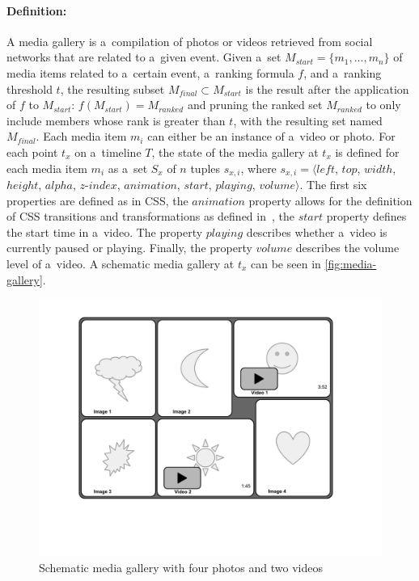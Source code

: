 \paragraph{Definition:}

A media gallery is a~compilation of photos or videos
retrieved from social networks that are related to a~given event.
Given a~set $M_{start} = \{m_1,..., m_n\}$ of media items related to a~certain event,
a~ranking formula $f$, and a~ranking threshold $t$,
the resulting subset $M_{final} \subset M_{start}$
is the result after the application of $f$ to $M_{start}$: $f(M_{start})=M_{ranked}$
and pruning the ranked set $M_{ranked}$ to only include members
whose rank is greater than $t$, with the resulting set named $M_{final}$.
Each media item $m_i$ can either be an instance of a~video or photo.
For each point $t_x$ on a~timeline $T$, the state of the media gallery
at $t_x$ is defined for each media item $m_i$
as a~set $S_x$ of $n$ tuples $s_{x,i}$, where
$s_{x,i}=\langle \mathit{left}$, $\mathit{top}$, $\mathit{width}$, $\mathit{height}$,
$\mathit{alpha}$, $\mathit{z\mbox{-}index}$, $\mathit{animation}$,
$\mathit{start}$, $\mathit{playing}$, $\mathit{volume} \rangle$.
The first six properties are defined as in CSS, the $\mathit{animation}$ property
allows for the definition of CSS transitions
and transformations as defined in~\cite{jackson2013csstransitions,fraser2012csstransforms},
the $\mathit{start}$ property defines the start time in a~video.
The property $\mathit{playing}$ describes whether a~video is currently paused or playing.
Finally, the property $\mathit{volume}$ describes the volume level
of a~video.
A schematic media gallery at $t_x$ can be seen in \autoref{fig:media-gallery}.

\begin{figure}[!ht]
  \centering
  \includegraphics[trim=20mm 40mm 20mm 10mm, clip, width=0.7\columnwidth]{media-gallery.pdf}
  \caption{Schematic media gallery with four photos and two videos}
  \label{fig:media-gallery}
\end{figure}

